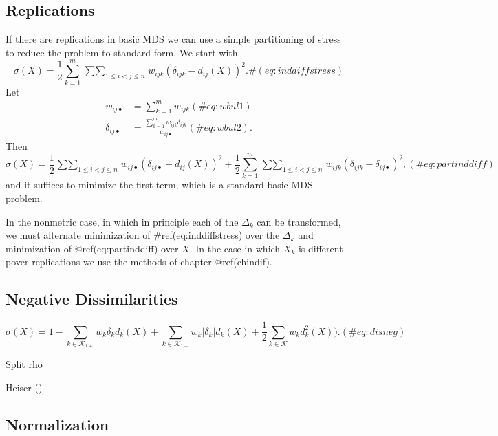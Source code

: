 \documentclass[
  12pt,
  letterpaper,
  DIV=11,
  numbers=noendperiod]{scrreprt}
\theoremstyle{remark}
\begin{document}
\subsection{Replications}\label{minrepl}

If there are replications in basic MDS we can use a simple partitioning
of stress to reduce the problem to standard form. We start with
\begin{equation}
\sigma(X)=\frac12\sum_{k=1}^m\mathop{\sum\sum}_{1\leq i<j\leq n}w_{ijk}(\delta_{ijk}-d_{ij}(X))^2.
\#(eq:inddiffstress)
\end{equation} Let \begin{align}
w_{ij\bullet}&=\sum_{k=1}^m w_{ijk}(\#eq:wbul1)\\
\delta_{ij\bullet}&=\frac{\sum_{k=1}^m w_{ijk}\delta_{ijk}}{w_{ij\bullet}}(\#eq:wbul2).
\end{align} Then \begin{equation}
\sigma(X)=\frac12\mathop{\sum\sum}_{1\leq i<j\leq n} w_{ij\bullet}(\delta_{ij\bullet}-d_{ij}(X))^2+\frac12\sum_{k=1}^m\mathop{\sum\sum}_{1\leq i<j\leq n} w_{ijk}(\delta_{ijk}-\delta_{ij\bullet})^2,
(\#eq:partinddiff)
\end{equation} and it suffices to minimize the first term, which is a
standard basic MDS problem.

In the nonmetric case, in which in principle each of the \(\Delta_k\)
can be transformed, we must alternate minimization of
\#ref(eq:inddiffstress) over the \(\Delta_k\) and minimization of
@ref(eq:partinddiff) over \(X\). In the case in which \(X_k\) is
different pover replications we use the methods of chapter
@ref(chindif).

\subsection{Negative Dissimilarities}\label{negative-dissimilarities}

\begin{equation}
\sigma(X)=1-\sum_{k\in\mathcal{K}_{1+}} w_k\delta_kd_k(X)
+\sum_{k\in\mathcal{K}_{1-}} w_k|\delta_k|d_k(X)+\frac12\sum_{k\in\mathcal{K}} w_kd_k^2(X)).
(\#eq:disneg)
\end{equation}

Split rho

Heiser ()

\subsection{Normalization}\label{normalization}
\end{document}
